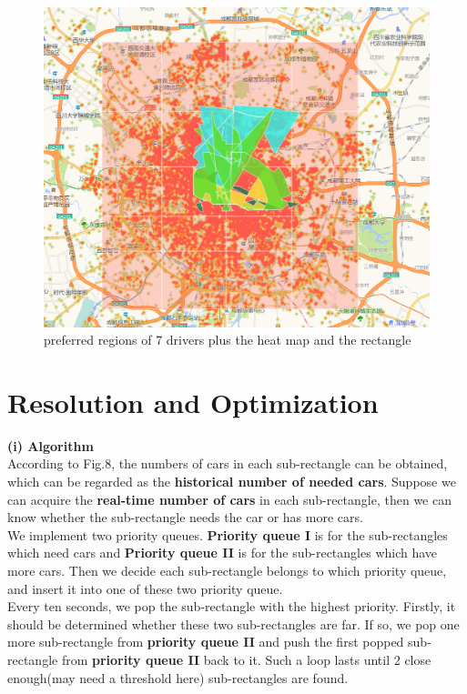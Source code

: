 \documentclass[10pt,journal]{IEEEtran}
\begin{document}
 \begin{figure}[!ht]
    \centering
    \includegraphics[width=1.0\columnwidth]{Fig/preferred_region_with_heat.png}
    \caption{preferred regions of 7 drivers plus the heat map and the rectangle}
 \end{figure}



\section{Resolution and Optimization}

\textbf{(i) Algorithm}\\

According to Fig.8, the numbers of cars in each sub-rectangle can be obtained, which can be regarded as the \textbf{historical number of needed cars}.  
Suppose we can acquire the \textbf{real-time number of cars} in each sub-rectangle, then we can know whether the sub-rectangle needs the car or has more cars. \\

We implement two priority queues. \textbf{Priority queue I} is for the sub-rectangles which need cars and \textbf{Priority queue II} is for the sub-rectangles which have more cars. Then we decide each sub-rectangle belongs to which priority queue, and insert it into one of these two priority queue.\\

Every ten seconds, we pop the sub-rectangle with the highest priority. Firstly, it should be determined whether these two sub-rectangles are far. If so, we pop one more sub-rectangle from \textbf{ priority queue II} and push the first popped sub-rectangle from \textbf{priority queue II} back to it. Such a loop lasts until 2 close enough(may need a threshold here) sub-rectangles are found.\\
\end{document}

